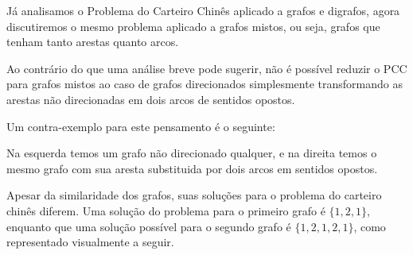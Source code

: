 \documentclass[12pt, a4paper]{article}
\begin{document}
    Já analisamos o Problema do Carteiro Chinês aplicado a grafos e digrafos, agora discutiremos o mesmo problema aplicado a grafos mistos, ou seja, grafos que tenham tanto arestas quanto arcos.

    Ao contrário do que uma análise breve pode sugerir, não é possível reduzir o PCC para grafos mistos ao caso de grafos direcionados simplesmente transformando as arestas não direcionadas em dois arcos de sentidos opostos.

    Um contra-exemplo para este pensamento é o seguinte:

    \begin{center}
        \hspace{3cm}%
    \end{center}

    Na esquerda temos um grafo não direcionado qualquer, e na direita temos o mesmo grafo com sua aresta substituida por dois arcos em sentidos opostos. 

    Apesar da similaridade dos grafos, suas soluções para o problema do carteiro chinês diferem.
    \sloppy Uma solução do problema para o primeiro grafo é $\{1, 2, 1\}$, enquanto que uma solução possível para o segundo grafo é $\{1, 2, 1, 2, 1\}$, como representado visualmente a seguir.
\end{document}
